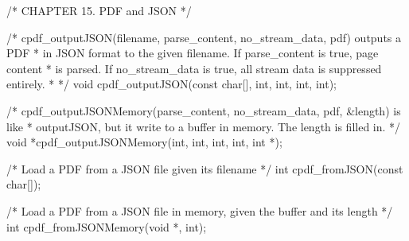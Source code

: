 /* CHAPTER 15. PDF and JSON */

/* cpdf_outputJSON(filename, parse_content, no_stream_data, pdf) outputs a PDF
 * in JSON format to the given filename. If parse_content is true, page content
 * is parsed. If no_stream_data is true, all stream data is suppressed entirely.
 * */
void cpdf_outputJSON(const char[], int, int, int, int);

/* cpdf_outputJSONMemory(parse_content, no_stream_data, pdf, &length) is like
 * outputJSON, but it write to a buffer in memory. The length is filled in. */
void *cpdf_outputJSONMemory(int, int, int, int, int *);

/* Load a PDF from a JSON file given its filename */
int cpdf_fromJSON(const char[]);

/* Load a PDF from a JSON file in memory, given the buffer and its length */
int cpdf_fromJSONMemory(void *, int);

